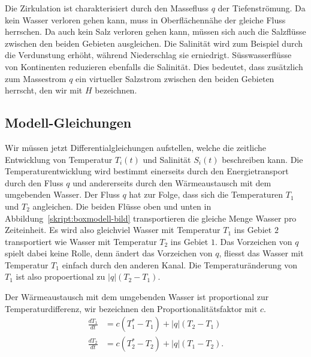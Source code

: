 Die Zirkulation ist charakterisiert durch den Massefluss $q$ der
Tiefenströmung.
Da kein Wasser verloren gehen kann, muss in Oberflächennähe der gleiche
Fluss herrschen.
Da auch kein Salz verloren gehen kann, müssen sich auch die Salzflüsse
zwischen den beiden Gebieten ausgleichen.
Die Salinität wird zum Beispiel durch die Verdunstung erhöht, während
Niederschlag sie erniedrigt.
Süsswasserflüsse von Kontinenten reduzieren ebenfalls die Salinität.
Dies bedeutet, dass zusätzlich zum Massestrom $q$ ein virtueller 
Salzstrom zwischen den beiden Gebieten herrscht, den wir mit $H$ bezeichnen.

\subsection{Modell-Gleichungen\label{skript:thc:modell-gleichungen}}
Wir müssen jetzt Differentialgleichungen aufstellen, welche die
zeitliche Entwicklung von Temperatur $T_i(t)$ und Salinität $S_i(t)$
beschreiben kann.
Die Temperaturentwicklung wird bestimmt einerseits durch den Energietransport
durch den Fluss $q$ und andererseits durch den Wärmeaustausch mit dem
umgebenden Wasser.
Der Fluss $q$ hat zur Folge, dass sich die Temperaturen $T_1$ und $T_2$
angleichen.
Die beiden Flüsse oben und unten in Abbildung~\ref{skript:boxmodell-bild}
transportieren die gleiche Menge Wasser pro Zeiteinheit.
Es wird also gleichviel Wasser mit Temperatur $T_1$ ins Gebiet $2$ 
transportiert wie Wasser mit Temperatur $T_2$ ins Gebiet $1$.
Das Vorzeichen von $q$ spielt dabei keine Rolle, denn ändert das
Vorzeichen von $q$, fliesst das Wasser mit Temperatur $T_1$ einfach
durch den anderen Kanal.
Die Temperaturänderung von $T_1$ ist also propoertional zu $|q|(T_2-T_1)$.

Der Wärmeaustausch mit dem umgebenden Wasser ist proportional zur
Temperaturdifferenz, wir bezeichnen den Proportionalitätsfaktor mit $c$.
\begin{equation}
\begin{aligned}
\frac{dT_1}{dt}
&=
c(T_1^*-T_1)
+
|q|(T_2-T_1)
\\
\frac{dT_2}{dt}
&=
c(T_2^*-T_2)
+
|q|(T_1-T_2).
\end{aligned}
\label{skript:thc:temperaturgleichung}
\end{equation}

